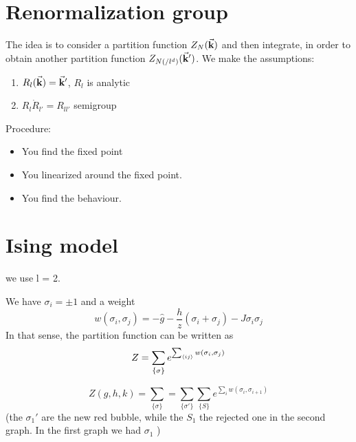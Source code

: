 \documentclass[../main/main.tex]{subfiles}
\begin{document}

\section{Renormalization group}

The idea is to consider a partition function \( Z_N (\va{k}) \) and then integrate, in order to obtain another partition function \( Z_{N(/l^d)} (\va{k}') \).
We make the assumptions:
\begin{enumerate}
\item \( R_l (\va{k}) = \va{k}' \), \( R_l \) is analytic
\item  \( R_l \dot R_{l'}  = R_{l l'} \)   semigroup %
\end{enumerate}

Procedure:
\begin{itemize}
\item You find the fixed point
\item You linearized around the fixed point.
\item You find the behaviour.
\end{itemize}

\section{Ising model}
we use l = 2.

We have \( \sigma _i = \pm 1 \) and a weight
\begin{equation}
  w (\sigma _i, \sigma _j) = - \hat{g} - \frac{h}{z} (\sigma _i + \sigma _j) - J \sigma _i \sigma _j
\end{equation}
In that sense, the partition function can be written as
\begin{equation}
  Z = \sum_{\{ \sigma  \}  }^{}  e^{\sum_{\expval{ij} }^{} w (\sigma _i, \sigma _j)  }
\end{equation}

\begin{equation}
  Z (g, h, k) = \sum_{\{ \sigma  \}  }^{}   = \sum_{\{ \sigma ' \}  }^{}  \sum_{\{ S \}  }^{} e^{\sum_{i}^{} w (\sigma _i, \sigma _{i+1}) }
\end{equation}
(the \( \sigma _1' \) are the new red bubble, while the \( S_1 \) the rejected one in the second graph. In the first graph we had \( \sigma _1 \)  )
\end{document}
